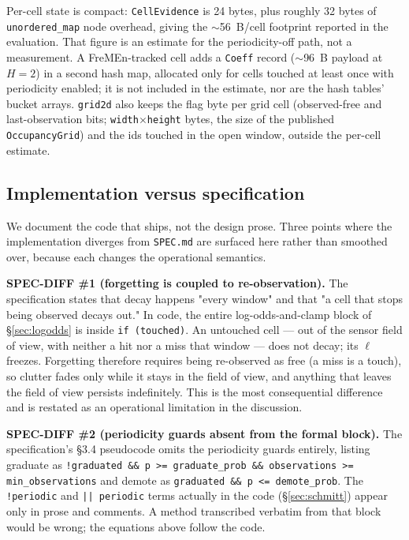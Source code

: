 \documentclass[conference]{IEEEtran}
\begin{document}
Per-cell state is compact: \texttt{CellEvidence} is 24 bytes, plus roughly 32 bytes of
\texttt{unordered\_map} node overhead, giving the $\sim$56~B/cell footprint reported in the
evaluation. That figure is an estimate for the periodicity-off path, not a
measurement. A FreMEn-tracked cell adds a \texttt{Coeff} record ($\sim$96~B
payload at $H=2$) in a second hash map, allocated only for cells touched at
least once with periodicity enabled; it is not included in the estimate, nor
are the hash tables' bucket arrays. \texttt{grid2d} also keeps the flag byte per
grid cell (observed-free and last-observation bits;
\texttt{width}$\times$\texttt{height} bytes, the size of the published
\texttt{OccupancyGrid}) and the ids touched in the open window, outside the
per-cell estimate.

\subsection{Implementation versus specification}
\label{sec:specdiff}

We document the code that ships, not the design prose. Three points where the
implementation diverges from \texttt{SPEC.md} are surfaced here rather than smoothed
over, because each changes the operational semantics.

\textbf{SPEC-DIFF \#1 (forgetting is coupled to re-observation).} The specification
states that decay happens "every window" and that "a cell that stops being
observed decays out." In code, the entire log-odds-and-clamp block of
\S\ref{sec:logodds} is inside \texttt{if (touched)}. An untouched cell --- out of the sensor
field of view, with neither a hit nor a miss that window --- does not decay; its
$\ell$ freezes. Forgetting therefore requires being re-observed as free (a miss
is a touch), so clutter fades only while it stays in the field of view, and
anything that leaves the field of view persists indefinitely. This is the most
consequential difference and is restated as an operational limitation in the
discussion.

\textbf{SPEC-DIFF \#2 (periodicity guards absent from the formal block).} The
specification's \S3.4 pseudocode omits the periodicity guards entirely, listing
graduate as \texttt{!graduated \&\& p >= graduate\_prob \&\& observations >= min\_observations}
and demote as \texttt{graduated \&\& p <= demote\_prob}. The \texttt{!periodic} and \texttt{|| periodic}
terms actually in the code (\S\ref{sec:schmitt}) appear only in prose and comments. A
method transcribed verbatim from that block would be wrong; the equations above
follow the code.
\end{document}
